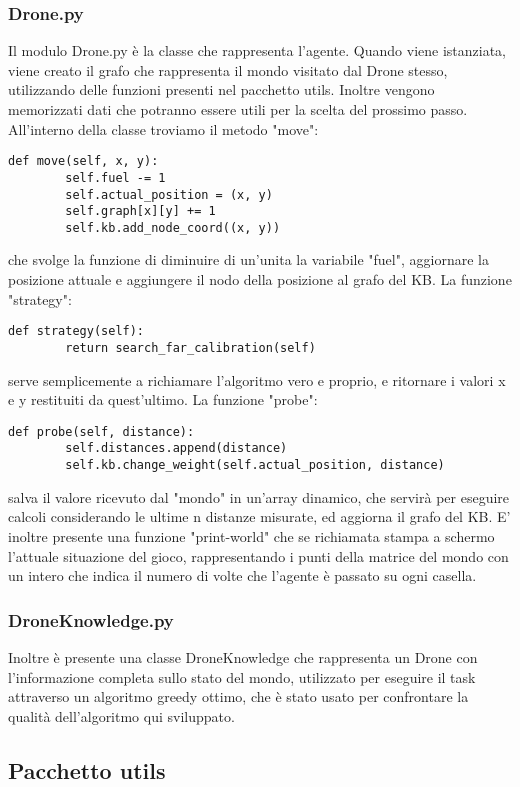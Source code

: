 \subsubsection{Drone.py}
Il modulo Drone.py è la classe che rappresenta l'agente. Quando viene istanziata, viene creato il grafo che rappresenta il mondo visitato dal Drone stesso, utilizzando delle funzioni presenti nel pacchetto utils. Inoltre vengono memorizzati dati che potranno essere utili per la scelta del prossimo passo. 
All'interno della classe troviamo il metodo "move":
\begin{verbatim}
def move(self, x, y):
        self.fuel -= 1
        self.actual_position = (x, y)
        self.graph[x][y] += 1
        self.kb.add_node_coord((x, y))
\end{verbatim}
che svolge la funzione di diminuire di un'unita la variabile "fuel", aggiornare la posizione attuale e aggiungere il nodo della posizione al grafo del KB. 
La funzione "strategy":
\begin{verbatim}
def strategy(self):
        return search_far_calibration(self)
\end{verbatim}
serve semplicemente a richiamare l'algoritmo vero e proprio, e ritornare i valori x e y restituiti da quest'ultimo. 
La funzione "probe":
\begin{verbatim}
def probe(self, distance):
        self.distances.append(distance)
        self.kb.change_weight(self.actual_position, distance)
\end{verbatim}
salva il valore ricevuto dal "mondo" in un'array dinamico, che servirà per eseguire calcoli considerando le ultime n distanze misurate, ed aggiorna il grafo del KB. 
E' inoltre presente una funzione "print-world" che se richiamata stampa a schermo l'attuale situazione del gioco, rappresentando i punti della matrice del mondo con un intero che indica il numero di volte che l'agente è passato su ogni casella.

\subsubsection{DroneKnowledge.py}
Inoltre è presente una classe DroneKnowledge che rappresenta un Drone con l'informazione completa sullo stato del mondo, utilizzato per eseguire il task attraverso un algoritmo greedy ottimo, che è stato usato per confrontare la qualità dell'algoritmo qui sviluppato.

\subsection{Pacchetto utils}

